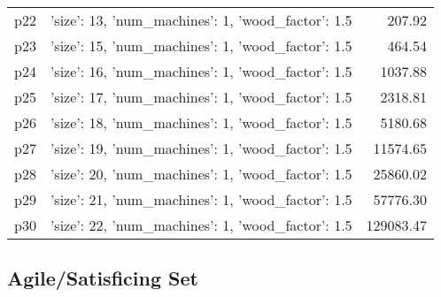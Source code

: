 \documentclass{article}
\begin{document}
\begin{center}
\begin{tabular}{@{}l|r|r@{}}
  p22&{'size': 13, 'num\_machines': 1, 'wood\_factor': 1.5}&207.92\\
  p23&{'size': 15, 'num\_machines': 1, 'wood\_factor': 1.5}&464.54\\
  p24&{'size': 16, 'num\_machines': 1, 'wood\_factor': 1.5}&1037.88\\
  p25&{'size': 17, 'num\_machines': 1, 'wood\_factor': 1.5}&2318.81\\
  p26&{'size': 18, 'num\_machines': 1, 'wood\_factor': 1.5}&5180.68\\
  p27&{'size': 19, 'num\_machines': 1, 'wood\_factor': 1.5}&11574.65\\
  p28&{'size': 20, 'num\_machines': 1, 'wood\_factor': 1.5}&25860.02\\
  p29&{'size': 21, 'num\_machines': 1, 'wood\_factor': 1.5}&57776.30\\
  p30&{'size': 22, 'num\_machines': 1, 'wood\_factor': 1.5}&129083.47
                            \end{tabular}
                            \end{center}
                    

                                \subsection*{Agile/Satisficing Set}
                                
\end{document}
